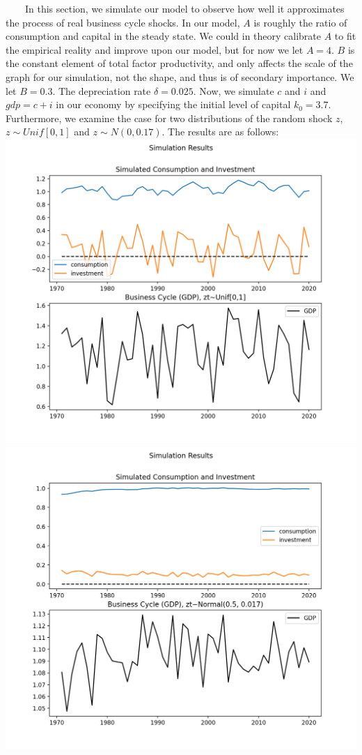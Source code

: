 \documentclass[
]{article}
\begin{document}
~~~~In this section, we simulate our model to observe how well it
approximates the process of real business cycle shocks. In our model,
\(A\) is roughly the ratio of consumption and capital in the steady
state. We could in theory calibrate \(A\) to fit the empirical reality
and improve upon our model, but for now we let \(A=4\). \(B\) is the
constant element of total factor productivity, and only affects the
scale of the graph for our simulation, not the shape, and thus is of
secondary importance. We let \(B = 0.3\). The depreciation rate
\(\delta = 0.025\). Now, we simulate \(c\) and \(i\) and \(gdp = c + i\)
in our economy by specifying the initial level of capital \(k_0 = 3.7\).
Furthermore, we examine the case for two distributions of the random
shock \(z\), \(z\sim Unif[0,1]\) and \(z \sim N(0, 0.17)\). The results
are as follows: \includegraphics{data/sim_uniform_shock.png}\\
\includegraphics{data/sim_normal_shock.png}
\end{document}
